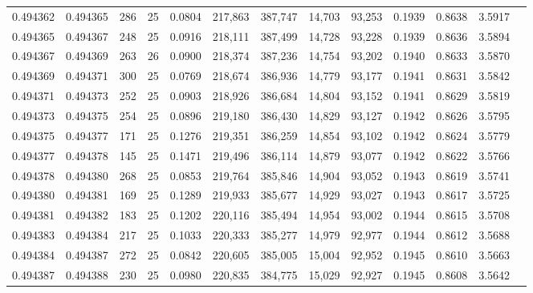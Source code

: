 \begin{tabular}{rrrrrrrrrrrrr}
0.494362 & 0.494365 &   286 &  25 &                                     0.0804 & 217,863 & 387,747 &  14,703 &  93,253 & 0.1939 & 0.8638 & 3.5917 \\
0.494365 & 0.494367 &   248 &  25 &                                     0.0916 & 218,111 & 387,499 &  14,728 &  93,228 & 0.1939 & 0.8636 & 3.5894 \\
0.494367 & 0.494369 &   263 &  26 &                                     0.0900 & 218,374 & 387,236 &  14,754 &  93,202 & 0.1940 & 0.8633 & 3.5870 \\
0.494369 & 0.494371 &   300 &  25 &                                     0.0769 & 218,674 & 386,936 &  14,779 &  93,177 & 0.1941 & 0.8631 & 3.5842 \\
0.494371 & 0.494373 &   252 &  25 &                                     0.0903 & 218,926 & 386,684 &  14,804 &  93,152 & 0.1941 & 0.8629 & 3.5819 \\
0.494373 & 0.494375 &   254 &  25 &                                     0.0896 & 219,180 & 386,430 &  14,829 &  93,127 & 0.1942 & 0.8626 & 3.5795 \\
0.494375 & 0.494377 &   171 &  25 &                                     0.1276 & 219,351 & 386,259 &  14,854 &  93,102 & 0.1942 & 0.8624 & 3.5779 \\
0.494377 & 0.494378 &   145 &  25 &                                     0.1471 & 219,496 & 386,114 &  14,879 &  93,077 & 0.1942 & 0.8622 & 3.5766 \\
0.494378 & 0.494380 &   268 &  25 &                                     0.0853 & 219,764 & 385,846 &  14,904 &  93,052 & 0.1943 & 0.8619 & 3.5741 \\
0.494380 & 0.494381 &   169 &  25 &                                     0.1289 & 219,933 & 385,677 &  14,929 &  93,027 & 0.1943 & 0.8617 & 3.5725 \\
0.494381 & 0.494382 &   183 &  25 &                                     0.1202 & 220,116 & 385,494 &  14,954 &  93,002 & 0.1944 & 0.8615 & 3.5708 \\
0.494383 & 0.494384 &   217 &  25 &                                     0.1033 & 220,333 & 385,277 &  14,979 &  92,977 & 0.1944 & 0.8612 & 3.5688 \\
0.494384 & 0.494387 &   272 &  25 &                                     0.0842 & 220,605 & 385,005 &  15,004 &  92,952 & 0.1945 & 0.8610 & 3.5663 \\
0.494387 & 0.494388 &   230 &  25 &                                     0.0980 & 220,835 & 384,775 &  15,029 &  92,927 & 0.1945 & 0.8608 & 3.5642 \\

\end{tabular}
